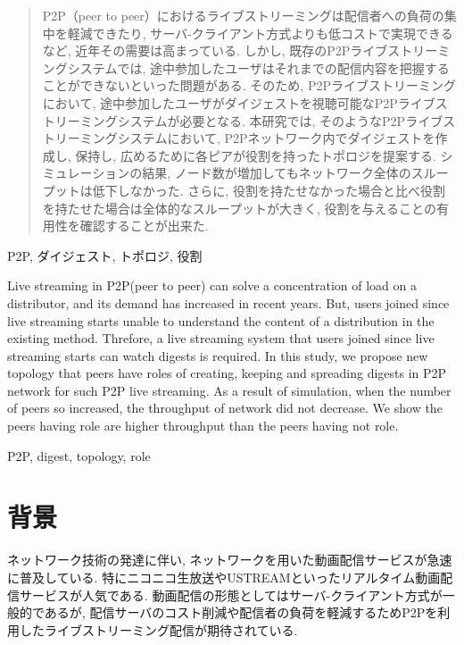 \documentclass[letter]{ieicej}
\begin{document}
\maketitle
\begin{abstract}
  P2P（peer to peer）におけるライブストリーミングは配信者への負荷の集中を軽減できたり, サーバ-クライアント方式よりも低コストで実現できるなど, 近年その需要は高まっている. しかし, 既存のP2Pライブストリーミングシステムでは, 途中参加したユーザはそれまでの配信内容を把握することができないといった問題がある. そのため, P2Pライブストリーミングにおいて, 途中参加したユーザがダイジェストを視聴可能なP2Pライブストリーミングシステムが必要となる. 本研究では, そのようなP2Pライブストリーミングシステムにおいて, P2Pネットワーク内でダイジェストを作成し, 保持し, 広めるために各ピアが役割を持ったトポロジを提案する. シミュレーションの結果, ノード数が増加してもネットワーク全体のスループットは低下しなかった. さらに, 役割を持たせなかった場合と比べ役割を持たせた場合は全体的なスループットが大きく, 役割を与えることの有用性を確認することが出来た.
\end{abstract}
\begin{keyword}
  P2P, ダイジェスト, トポロジ, 役割
\end{keyword}
\begin{eabstract}
  Live streaming in P2P(peer to peer) can solve a concentration of load on a distributor, and its demand has increased in recent years. But, users joined since live streaming starts unable to understand the content of a distribution in the existing method. Threfore, a live streaming system that users joined since live streaming starts can watch digests is required. In this study, we propose new topology that peers have roles of creating, keeping and spreading digests in P2P network for such  P2P live streaming. As a result of simulation, when the number of peers so increased, the throughput of network did not decrease. We show the peers having role are higher throughput than the peers having not role.
\end{eabstract}
\begin{ekeyword}
  P2P, digest, topology, role
\end{ekeyword}

\section{背景}
ネットワーク技術の発達に伴い, ネットワークを用いた動画配信サービスが急速に普及している. 特にニコニコ生放送\cite{nico}やUSTREAM\cite{ust}といったリアルタイム動画配信サービスが人気である. 動画配信の形態としてはサーバ-クライアント方式が一般的であるが, 配信サーバのコスト削減や配信者の負荷を軽減するためP2Pを利用したライブストリーミング配信が期待されている.
\end{document}
